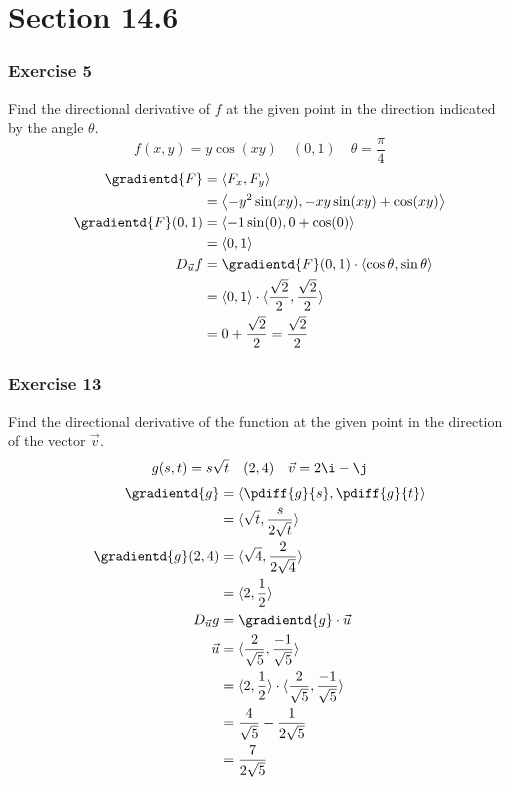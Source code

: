 \documentclass[letterpaper, 12pt]{math}
\begin{document}
\section*{Section 14.6}

\subsubsection*{Exercise 5}
Find the directional derivative of \( f \) at the given point in the direction
indicated by the angle \( \theta \).
\[ f(x,y) = y\cos(xy) \quad (0,1) \quad \theta = \frac{\pi}{4} \]
\begin{align*}
  \gradientd{F} &= \langle F_x,F_y\rangle \\
  &= \left\langle -y^2\sin(xy),-xy\sin(xy)+\cos(xy)\right\rangle \\
  \gradientd{F}(0,1) &= \langle-1\sin(0),0+\cos(0)\rangle \\
  &= \langle0,1\rangle \\
  D_{\vec{u}}f &= \gradientd{F}(0,1)\cdot\langle\cos\theta,\sin\theta\rangle \\
  &= \langle0,1\rangle\cdot
    \langle\frac{\sqrt{2}}{2},\frac{\sqrt{2}}{2}\rangle \\
  &= 0+\frac{\sqrt{2}}{2} = \frac{\sqrt{2}}{2}
\end{align*}

\subsubsection*{Exercise 13}
Find the directional derivative of the function at the given point in the
direction of the vector \( \vec{v} \).
\[ g(s,t) = s\sqrt{t} \quad (2,4) \quad \vec{v} = 2\i-\j \]
\begin{align*}
  \gradientd{g} &= \langle\pdiff{g}{s},\pdiff{g}{t}\rangle \\
  &= \langle\sqrt{t},\frac{s}{2\sqrt{t}}\rangle \\
  \gradientd{g}(2,4) &= \langle\sqrt{4},\frac{2}{2\sqrt{4}}\rangle \\
  &= \langle2,\frac{1}{2}\rangle \\
  D_{\vec{u}}g &= \gradientd{g}\cdot\vec{u} \\
  \vec{u} &= \langle\frac{2}{\sqrt{5}},\frac{-1}{\sqrt{5}}\rangle \\
  &= \langle2,\frac{1}{2}\rangle\cdot
    \langle\frac{2}{\sqrt{5}},\frac{-1}{\sqrt{5}}\rangle \\
  &= \frac{4}{\sqrt{5}}-\frac{1}{2\sqrt{5}} \\
  &= \frac{7}{2\sqrt{5}}
\end{align*}
\end{document}
